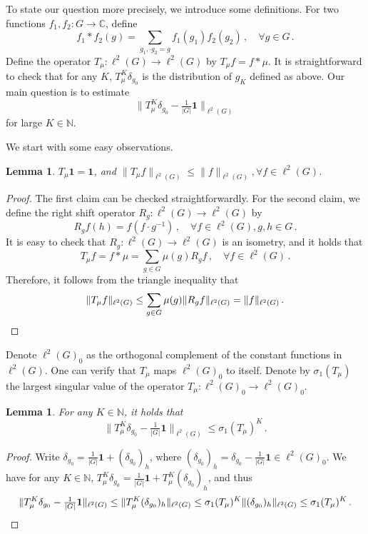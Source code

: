 \documentclass[12pt]{amsart}
\newtheorem{lemma}[theorem]{Lemma}
\begin{document}
To state our question more precisely, we introduce some definitions. For two functions $f_1,f_2:G\to \mathbb C$, define
\[
f_1\ast f_2(g)=\sum_{g_1,\cdot g_2=g}f_1(g_1)f_2(g_2)\,,\quad\forall g\in G\,.
\]
Define the operator $T_\mu:\ell^2(G)\to \ell^2(G)$ by $T_\mu f=f\ast \mu$.  It is straightforward to check that for any $K$, $T_\mu^K\delta_{g_0}$ is the distribution of $g_K$ defined as above. Our main question is to estimate
\[
\|T_\mu^K\delta_{g_0}-\tfrac{1}{|G|}\mathbf{1}\|_{\ell^2(G)}
\]
for large $K\in \mathbb N$.

We start with some easy observations.
\begin{lemma}
    $T_\mu \mathbf 1=\mathbf 1$, and $\|T_\mu f\|_{\ell^2(G)}\le \|f\|_{\ell^2(G)},\forall f\in \ell^2(G)$. 
\end{lemma}
\begin{proof}
    The first claim can be checked straightforwardly. For the second claim, we define the right shift operator $R_g:\ell^2(G)\to \ell^2(G)$ by
    \[
    R_g f(h)=f(f\cdot g^{-1})\,,\quad\forall f\in \ell^2(G),g,h\in G\,.
    \]
    It is easy to check that $R_g:\ell^2(G)\to \ell^2(G)$ is an isometry, and it holds that
    \[
    T_\mu f=f\ast \mu=\sum_{g\in G}\mu(g)R_gf\,,\quad \forall f\in \ell^2(G)\,.
    \]
    Therefore, it follows from the triangle inequality that
    \[
    \|T_\mu f\|_{\ell^2(G)}\le \sum_{g\in G}\mu(g)\|R_gf\|_{\ell^2(G)}=\|f\|_{\ell^2(G)}\,.\qedhere
    \]
\end{proof}
Denote $\ell^2(G)_0$ as the orthogonal complement of the constant functions in $\ell^2(G)$. One can verify that $T_\mu$ maps $\ell^2(G)_0$ to itself. Denote by $\sigma_1(T_\mu)$ the largest singular value of the operator $T_\mu:\ell^2(G)_0\to \ell^2(G)_0$.
\begin{lemma}\label{lem-mixing}
    For any $K\in \mathbb N$, it holds that
    \[
    \|T_\mu^K\delta_{g_0}-\tfrac{1}{|G|}\mathbf{1}\|_{\ell^2(G)}\le \sigma_1(T_\mu)^K\,.
    \]
\end{lemma}
\begin{proof}
    Write $\delta_{g_0}=\tfrac{1}{|G|}\mathbf{1}+(\delta_{g_0})_h$, where $(\delta_{g_0})_h=\delta_{g_0}-\tfrac{1}{|G|}\mathbf{1}\in \ell^2(G)_0$. We have for any $K\in \mathbb N$, $T_\mu^K\delta_{g_0}=\tfrac{1}{|G|}\mathbf{1}+T_\mu^K(\delta_{g_0})_h$, and thus
    \[
     \|T_\mu^K\delta_{g_0}-\tfrac{1}{|G|}\mathbf{1}\|_{\ell^2(G)}\le \|T_\mu^K(\delta_{g_0})_h\|_{\ell^2(G)}\le \sigma_1(T_\mu)^K\|(\delta_{g_0})_h\|_{\ell^2(G)}\le \sigma_1(T_\mu)^K\,.\qedhere
    \]
\end{proof}
\end{document}
